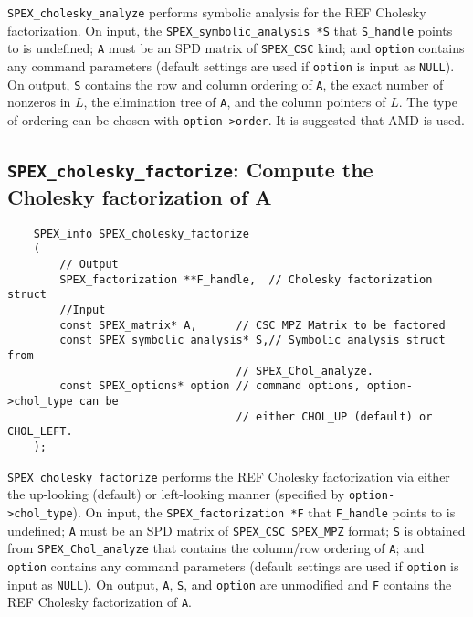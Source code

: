 \documentclass[12pt]{report}
\theoremstyle{definition}
\begin{document}
\verb|SPEX_cholesky_analyze| performs symbolic analysis for the REF Cholesky factorization. On input, the \verb|SPEX_symbolic_analysis *S| that  \verb|S_handle| points to is undefined;  \verb|A| must be an SPD matrix of \verb|SPEX_CSC| kind;  and \verb|option| contains any command parameters  (default settings are used if
\verb|option| is input as \verb|NULL|). On output, \verb|S| contains the row and column ordering of \verb|A|, the exact number of nonzeros in $L$, the elimination tree of \verb|A|, and the column pointers of $L$. The type of ordering can be chosen with \verb|option->order|. It is suggested that AMD is used.



\subsection{\texttt{SPEX\_cholesky\_factorize}: Compute the Cholesky factorization of A} \label{ss:spex_chol_factorize}

\begin{mdframed}[userdefinedwidth=6in]
{\footnotesize
\begin{verbatim}
    SPEX_info SPEX_cholesky_factorize
    (
        // Output
        SPEX_factorization **F_handle,  // Cholesky factorization struct
        //Input
        const SPEX_matrix* A,      // CSC MPZ Matrix to be factored   
        const SPEX_symbolic_analysis* S,// Symbolic analysis struct from
                                   // SPEX_Chol_analyze.
        const SPEX_options* option // command options, option->chol_type can be
                                   // either CHOL_UP (default) or CHOL_LEFT.
    );
\end{verbatim}
} \end{mdframed}

\verb|SPEX_cholesky_factorize| performs the REF Cholesky factorization via either the up-looking  (default) or left-looking manner (specified by \verb|option->chol_type|). On input, the \verb|SPEX_factorization *F| that \verb|F_handle| points to is undefined; \verb|A| must be an SPD matrix of \verb|SPEX_CSC SPEX_MPZ| format; \verb|S| is obtained from \verb|SPEX_Chol_analyze| that contains the column/row ordering of \verb|A|; and \verb|option| contains any command parameters   (default settings are used if
\verb|option| is input as \verb|NULL|). On output, \verb|A|, \verb|S|, and \verb|option| are unmodified and \verb|F| contains the REF Cholesky factorization of \verb|A|.
\end{document}
